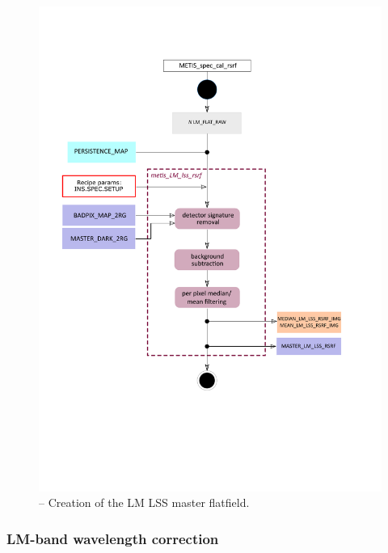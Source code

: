 \begin{figure}[ht]
  \centering
  \includegraphics[width=0.5\textheight]{figures/metis_lm_lss_flat.pdf}
  \caption[Recipe: ]{ --
    Creation of the LM LSS master flatfield.}
  \label{Fig:rec_lm_lss_flat}
\end{figure}
\clearpage

\subsubsection{LM-band wavelength correction}\label{subsubsection:LM_LSS_wave}

